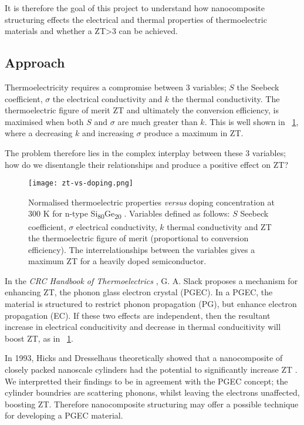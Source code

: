 \documentclass[12pt,draft]{article}
\newcommand{\figref}[2][\figurename~]{#1\ref{#2}}
\begin{document}
It is therefore the goal of this project to understand how nanocomposite structuring effects the electrical and thermal properties of thermoelectric materials and whether a ZT\textgreater3 can be achieved.

\subsection{Approach}
Thermoelectricity requires a compromise between 3 variables; $S$ the Seebeck coefficient, $\sigma$ the electrical conductivity and $k$ the thermal conductivity. The thermoelectric figure of merit ZT and ultimately the conversion efficiency, is maximised when both $S$ and $\sigma$ are much greater than $k$. This is well shown in \figref{fig:zt-vs-doping}, where a decreasing $k$ and increasing $\sigma$ produce a maximum in ZT.

The problem therefore lies in the complex interplay between these 3 variables; how do we disentangle their relationships and produce a positive effect on ZT?

\begin{figure}
	\centering
	\texttt{[image: zt-vs-doping.png]}
	\caption{Normalised thermoelectric properties \emph{versus} doping concentration at 300 K for n-type Si\textsubscript{80}Ge\textsubscript{20} \cite{minnich-review}. Variables defined as follows: $S$ Seebeck coefficient, $\sigma$ electrical conductivity, $k$ thermal conductivity and ZT the thermoelectric figure of merit (proportional to conversion efficiency). The interrelationships between the variables gives a maximum ZT for a heavily doped semiconductor.}
	\label{fig:zt-vs-doping}
\end{figure}

In the \emph{CRC Handbook of Thermoelectrics} \cite{crc-handbook}, G. A. Slack proposes a mechanism for enhancing ZT, the phonon glass electron crystal (PGEC). In a PGEC, the material is structured to restrict phonon propagation (PG), but enhance electron propagation (EC). If these two effects are independent, then the resultant increase in electrical conducitivity and decrease in thermal conducitivity will boost ZT, as in \figref{fig:zt-vs-doping}.

In 1993, Hicks and Dresselhaus theoretically showed that a nanocomposite of closely packed nanoscale cylinders had the potential to significantly increase ZT \cite{nanowires}. We interpretted their findings to be in agreement with the PGEC concept; the cylinder boundries are scattering phonons, whilst leaving the electrons unaffected, boosting ZT. Therefore nanocomposite structuring may offer a possible technique for developing a PGEC material.
\end{document}
